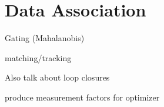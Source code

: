 \section{Data Association}


Gating (Mahalanobis)

matching/tracking

Also talk about loop closures

produce measurement factors for optimizer